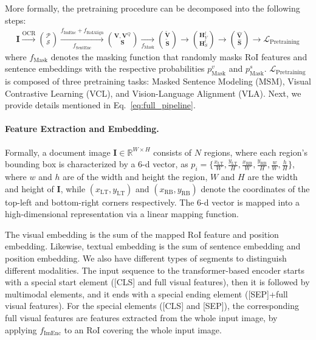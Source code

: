 \documentclass{article}
\begin{document}
	More formally, the pretraining procedure can be decomposed into the following steps:
	\begin{align}\label{eq:full_pipeline}
		\mathbf{I} \xrightarrow[]{\text{OCR}}
		\binom{\mathcal{P}}{\mathcal{S}}
		\xrightarrow[f_{\text{SentEnc}}]{f_{\text{ImEnc}}+f_{\text{RoIAlign}}}
		\binom{\mathbf{V}, \mathbf{V}^Q}{\mathbf{S}}
		\xrightarrow[f_{\text{Mask}}]{}
		\binom{\mathbf{\tilde{V}}}{\mathbf{\tilde{S}}}
		\xrightarrow[]{}
		\binom{\mathbf{H}_V^{l}}{\mathbf{H}_S^{l}}
		\xrightarrow[]{}
		\binom{\mathbf{\hat{V}}}{\mathbf{\hat{S}}}
		\xrightarrow[]{}
		\mathcal{L}_{\text{Pretraining}}
	\end{align}
	where $f_\text{Mask}$ denotes the masking function that randomly mask{s} RoI features and sentence embeddings with {the respective} probabilities $p_{\text{Mask}}^v$ and $p_{\text{Mask}}^s$.
	{$\mathcal{L}_{\text{Pretraining}}$ is composed of  three pretraining tasks: {Masked Sentence Modeling (MSM), Visual Contrastive Learning (VCL), and Vision-Language Alignment (VLA)}.}
	{Next, we provide details mentioned in Eq.~\ref{eq:full_pipeline}.}
	
	\paragraph{Feature Extraction and Embedding.}
	Formally, a document image $\mathbf{I}\in \mathbb{R}^{W\times H}$ consists of $N$ regions, {where each region's bounding box is characterized by a 6-d vector}, as $p_i=\{\frac{x_{\text{LT}}}{W}, \frac{y_{\text{LT}}}{H}, \frac{x_{\text{RB}}}{W}, \frac{y_{\text{RB}}}{H}, \frac{w}{W},\frac{h}{H}\}$, where $w$ and $h$ are of the width and height the {region}, $W$ and $H$ are the width and height of {$\mathbf{I}$}, {while} $(x_{\text{LT}}, y_{\text{LT}})$ and $(x_{\text{RB}}, y_{\text{RB}})$ denote the coordinate{s} of the top-left and bottom-right corner{s} respectively. The 6-d vector is {mapped} into a high-dimensional representation via {a} linear mapping function.
	
	The visual embedding is the sum of the {mapped RoI feature and position embedding}. {Likewise, textual embedding is the sum of sentence embedding and position embedding}. We {also have different types of segments to distinguish different modalities}.
	The input sequence {to the transformer-based encoder} starts with a special start element ([CLS] and full {visual} feature{s}), {then it is followed by} multimodal elements, and {it} ends with a special ending element ([SEP]+full {visual} feature{s}). For the special elements ({[CLS] and [SEP]}), the corresponding full {visual} features are features extracted {from} the whole input image, by applying {$f_{\text{ImEnc}}$} {to} an RoI covering the whole input image.
	
\end{document}
